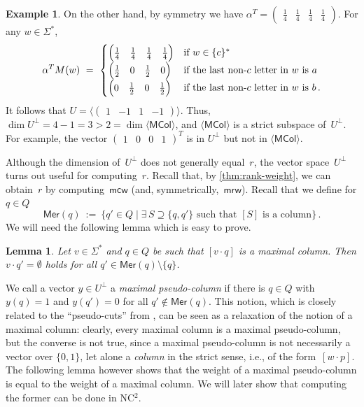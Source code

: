 \documentclass[11pt,a4paper]{amsart}
\newcommand{\NCT}{\textnormal{\textsf{NC$^2$}}\xspace}
\newcommand{\spn}[1]{\mathord{\langle #1 \rangle}}
\newcommand{\Mer}{\mathsf{Mer}}
\newcommand{\mcw}{\mathsf{mcw}}
\newcommand{\mrw}{\mathsf{mrw}}
\newcommand{\MCol}{\mathsf{MCol}}
\theoremstyle{plain}
\newtheorem{lem}[thm]{Lemma}
\theoremstyle{definition}
\newtheorem{exa}[thm]{Example}
\theoremstyle{defC}
\theoremstyle{thmC}
\theoremstyle{plain}
\numberwithin{equation}{section}
\begin{document}
\begin{exa}
On the other hand, by symmetry we have $\alpha^T = \begin{pmatrix} \frac14 & \frac14 & \frac14 & \frac14 \end{pmatrix}$.
For any $w \in \Sigma^*$,
\[
\alpha^T M(w) \ = \ \begin{cases}
 \begin{pmatrix} \frac14 & \frac14 & \frac14 & \frac14 \end{pmatrix} & \text{if } w \in \{c\}^* \\
 \begin{pmatrix} \frac12 & 0 & \frac12 & 0 \end{pmatrix} & \text{if the last non-$c$ letter in $w$ is $a$} \\
 \begin{pmatrix} 0 & \frac12 & 0 & \frac12 \end{pmatrix} & \text{if the last non-$c$ letter in $w$ is $b$\,.}
\end{cases}
\]
It follows that $U = \spn{\begin{pmatrix} 1 & -1 & 1 & -1 \end{pmatrix}}$.
Thus, $\dim U^\bot = 4 - 1 = 3 > 2 = \dim \spn{\MCol}$, and $\spn{\MCol}$ is a strict subspace of~$U^\bot$.
For example, the vector $\begin{pmatrix} 1 & 0 & 0 & 1 \end{pmatrix}^T$ is in $U^\bot$ but not in $\spn{\MCol}$.
\end{exa}

\noindent
Although the dimension of~$U^\bot$ does not generally equal~$r$, the vector space~$U^\bot$ turns out useful for computing~$r$.
Recall that, by \autoref{thm:rank-weight}, we can obtain~$r$ by computing~$\mcw$ (and, symmetrically,~$\mrw$). Recall that we define for $q \in Q$
\[
 \Mer(q) \ := \ \{q' \in Q \mid \exists\,S \supseteq \{q,q'\} \text{ such that } [S] \text{ is a column}\}\,.
\]
We will need the following lemma which is easy to prove.

\begin{lem}\label{lem:max-column-body}
Let $v \in \Sigma^*$ and $q \in Q$ be such that $[v \cdot q]$ is a maximal column. Then $v \cdot q' = \emptyset$ holds for all $q' \in \Mer(q) \setminus \{q\}$.
\end{lem}

\noindent
We call a vector $y \in U^\bot$ a \emph{maximal pseudo-column} if there is $q \in Q$ with $y(q) = 1$ and $y(q') = 0$ for all $q' \not\in \Mer(q)$.
This notion, which is closely related to the ``pseudo-cuts'' from \cite{KieferW19}, can be seen as a relaxation of the notion of a maximal column: clearly, every maximal column is a maximal pseudo-column, but the converse is not true, since a maximal pseudo-column is not necessarily a vector over $\{0, 1\}$, let alone a \emph{column} in the strict sense, i.e., of the form~$[w \cdot p]$. The following lemma however shows that the weight of a maximal pseudo-column is equal to the weight of a maximal column. We will later show that computing the former can be done in \NCT.
\end{document}
